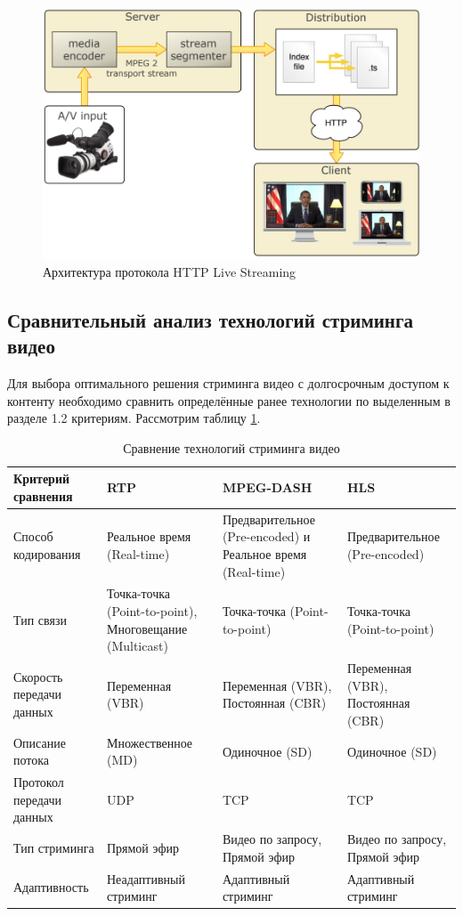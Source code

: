 	\begin{figure}[ht!] 
		\center
		\includegraphics [scale=0.6] {my_folder/images//hls_architecture}
		\caption{Архитектура протокола HTTP Live Streaming \cite{fecheyrHlsReview}} 
		\label{fig:hls_architecture}  
	\end{figure}

\subsection{Сравнительный анализ технологий стриминга видео}

	Для выбора оптимального решения стриминга видео с долгосрочным доступом к контенту необходимо сравнить определённые ранее технологии по выделенным в разделе 1.2 критериям. Рассмотрим таблицу \ref{fig:streaming_compare}.

	\begin{table} [htbp]%
		\centering\small
		\caption{Сравнение технологий стриминга видео}%
		\begin{tabular}{|p{3.5cm}|p{3.5cm}|p{3.5cm}|p{3.5cm}|}
			\hline
			Критерий сравнения&RTP&MPEG-DASH&HLS\\
			\hline
			Способ кодирования&Реальное время (Real-time)&Предварительное (Pre-encoded) и Реальное время (Real-time)&Предварительное (Pre-encoded)\\ \hline
			Тип связи&Точка-точка (Point-to-point), Многовещание (Multicast)&Точка-точка (Point-to-point)&Точка-точка (Point-to-point)\\ \hline
			Скорость передачи данных&Переменная (VBR)&Переменная (VBR), Постоянная (CBR)&Переменная (VBR), Постоянная (CBR)\\ \hline
			Описание потока&Множественное (MD)&Одиночное (SD)&Одиночное (SD)\\ \hline
			Протокол передачи данных&UDP&TCP&TCP\\ \hline
			Тип стриминга&Прямой эфир&Видео по запросу, Прямой эфир&Видео по запросу, Прямой эфир\\ \hline		
			Адаптивность&Неадаптивный стриминг&Адаптивный стриминг&Адаптивный стриминг\\ \hline		
		\end{tabular}	
		\label{fig:streaming_compare}
		\normalsize%
	\end{table}
	
